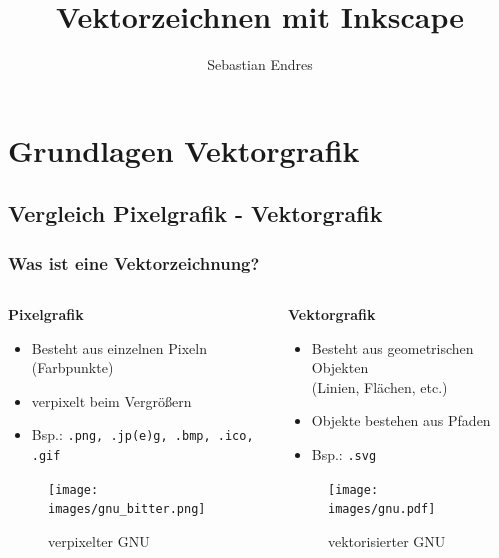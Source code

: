 \documentclass[german]{beamer} %
\title{Vektorzeichnen mit Inkscape}
\author{Sebastian Endres}
\newcommand{\images}{vektorzeichnen/}
\begin{document}

\maketitle


\frame{\tableofcontents}


\section{Grundlagen Vektorgrafik}
\subsection{Vergleich Pixelgrafik - Vektorgrafik}
\begin{frame}[t]
  \frametitle{Was ist eine Vektorzeichnung?}
  
  \begin{columns}[t]
  	\begin{column}{0.5\textwidth}
  		\textbf{Pixelgrafik}
  		\begin{itemize}
  			\item Besteht aus einzelnen Pixeln (Farbpunkte)
  			\item verpixelt beim Vergrößern
  			\item Bsp.: \texttt{.png, .jp(e)g, .bmp, .ico, .gif}
  		\end{itemize}
  		\begin{figure}
  		   \centering
  			\texttt{[image: \\images/gnu\_bitter.png]}
  			\caption{verpixelter GNU}
  			\label{fig:gnu_bitter}
  		\end{figure}
  	\end{column}
  	
  	\begin{column}{0.5\textwidth}
  	\textbf{Vektorgrafik}
  		\begin{itemize}
  			\item Besteht aus geometrischen Objekten \\(Linien, Flächen, etc.)
  			\item Objekte bestehen aus Pfaden
  			\item Bsp.: \texttt{.svg}
  		\end{itemize}
  		\begin{figure}
  			\centering
  			\texttt{[image: \\images/gnu.pdf]}
  			\caption{vektorisierter GNU}
  			\label{fig:gnu_vektor}
  		\end{figure}
  	\end{column}
  \end{columns}
  
 \end{frame}
\end{document}

